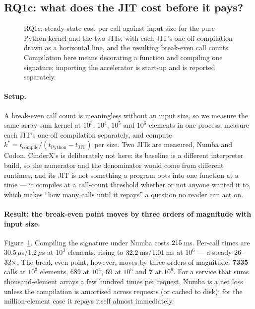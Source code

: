 \subsection{RQ1c: what does the JIT cost before it pays?}
\label{sec:rq1c}

\begin{figure}[t]
  \centering
  \caption{RQ1c: steady-state cost per call against input size for the pure-Python kernel and
    the two JITs, with each JIT's one-off compilation drawn as a horizontal line, and the
    resulting break-even call counts. Compilation here means decorating a function and
    compiling one signature; importing the accelerator is start-up and is reported separately.}
  \label{fig:breakeven}
\end{figure}

\paragraph{Setup.} A break-even call count is meaningless without an input size, so we
measure the same array-sum kernel at $10^3$, $10^4$, $10^5$ and $10^6$ elements in one
process, measure each JIT's one-off compilation separately, and compute
$k^{*} = t_{\text{compile}} / (t_{\text{Python}} - t_{\text{JIT}})$ per size. Two JITs are
measured, Numba and Codon. CinderX's is deliberately not here: its baseline is a different
interpreter build, so the numerator and the denominator would come from different runtimes,
and its JIT is not something a program opts into one function at a time --- it compiles at a
call-count threshold whether or not anyone wanted it to, which makes ``how many calls until it
repays'' a question no reader can act on.

\paragraph{Result: the break-even point moves by three orders of magnitude with input size.}
Figure~\ref{fig:breakeven}. Compiling the signature under Numba costs
$\meas{fact:b1_breakeven-314:facts.numba_compile_s:ms}{215}$\,ms. Per-call times are $30.5\,\mu$s/$1.2\,\mu$s at $10^3$ elements, rising to
$\meas{med:b1_breakeven-314:arraysum_n1000000/cpython_loop:ms}{32.2}$\,ms/$\meas{med:b1_breakeven-314:arraysum_n1000000/numba:ms}{1.01}$\,ms at $10^6$ --- a steady $26$--$\meas{ratio:b1_breakeven-314:arraysum_n1000000/cpython_loop|b1_breakeven-314:arraysum_n1000000/numba}{32}\times$. The break-even point, however,
moves by three orders of magnitude: \textbf{7335} calls at $10^3$ elements, 689 at $10^4$,
69 at $10^5$ and \textbf{7} at $10^6$. For a service that sums thousand-element arrays a
few hundred times per request, Numba is a net loss unless the compilation is amortised
across requests (or cached to disk); for the million-element case it repays itself almost
immediately.

